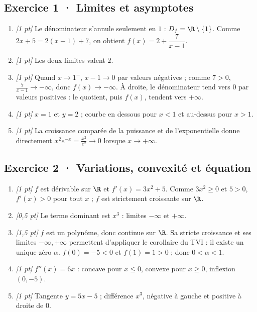 \subsection*{Exercice 1 · Limites et asymptotes}\begin{enumerate}

\item \textit{[1 pt]} Le dénominateur s'annule seulement en $1$ : $D_f=\R\setminus\{1\}$. Comme $2x+5=2(x-1)+7$, on obtient $f(x)=2+\dfrac{7}{x-1}$.

\item \textit{[1 pt]} Les deux limites valent $2$.

\item \textit{[1 pt]} Quand $x\to 1^-$, $x-1\to0$ par valeurs négatives ; comme $7>0$, $\frac{7}{x-1}\to-\infty$, donc $f(x)\to-\infty$. À droite, le dénominateur tend vers $0$ par valeurs positives : le quotient, puis $f(x)$, tendent vers $+\infty$.

\item \textit{[1 pt]} $x=1$ et $y=2$ ; courbe en dessous pour $x<1$ et au-dessus pour $x>1$.

\item \textit{[1 pt]} La croissance comparée de la puissance et de l'exponentielle donne directement $x^2e^{-x}=\frac{x^2}{e^x}\to0$ lorsque $x\to+\infty$.

\end{enumerate}

\subsection*{Exercice 2 · Variations, convexité et équation}\begin{enumerate}

\item \textit{[1 pt]} $f$ est dérivable sur $\R$ et $f'(x)=3x^2+5$. Comme $3x^2\ge0$ et $5>0$, $f'(x)>0$ pour tout $x$ ; $f$ est strictement croissante sur $\R$.

\item \textit{[0,5 pt]} Le terme dominant est $x^3$ : limites $-\infty$ et $+\infty$.

\item \textit{[1,5 pt]} $f$ est un polynôme, donc continue sur $\R$. Sa stricte croissance et ses limites $-\infty,+\infty$ permettent d'appliquer le corollaire du TVI : il existe un unique zéro $\alpha$. $f(0)=-5<0$ et $f(1)=1>0$ ; donc $0<\alpha<1$.

\item \textit{[1 pt]} $f''(x)=6x$ : concave pour $x\le0$, convexe pour $x\ge0$, inflexion $(0,-5)$.

\item \textit{[1 pt]} Tangente $y=5x-5$ ; différence $x^3$, négative à gauche et positive à droite de $0$.

\end{enumerate}

